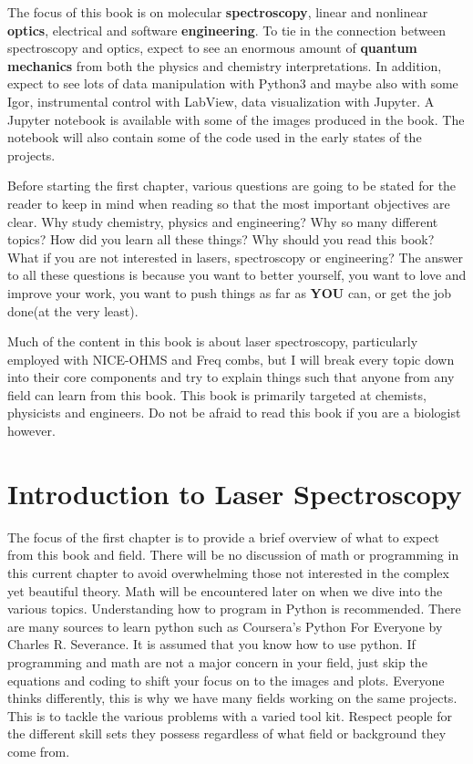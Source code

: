\documentclass[11pt,a4paper]{book}
\begin{document}
	The focus of this book is on molecular {\bfseries spectroscopy}, linear and nonlinear {\bfseries optics}, electrical and software {\bfseries engineering}. To tie in the connection between spectroscopy and optics, expect to see an enormous amount of {\bfseries quantum mechanics} from both the physics and chemistry interpretations. In addition, expect to see lots of data manipulation with Python3 and maybe also with some Igor, instrumental control with LabView, data visualization with Jupyter. A Jupyter notebook is available with some of the images produced in the book. The notebook will also contain some of the code used in the early states of the projects.
	
	Before starting the first chapter, various questions are going to be stated for the reader to keep in mind when reading so that the most important objectives are clear. Why study chemistry, physics and engineering? Why so many different topics? How did you learn all these things? Why should you read this book? What if you are not interested in lasers, spectroscopy or engineering? The answer to all these questions is because you want to better yourself, you want to love and improve your work, you want to push things as far as {\bfseries YOU} can, or get the job done(at the very least). 
	
	Much of the content in this book is about laser spectroscopy, particularly employed with NICE-OHMS and Freq combs, but I will break every topic down into their core components and try to explain things such that anyone from any field can learn from this book. This book is primarily targeted at chemists, physicists and engineers. Do not be afraid to read this book if you are a biologist however.
	
\mainmatter
\chapter{Introduction to Laser Spectroscopy}
	\label{chp:Introduction to Laser Spectroscopy}	
	The focus of the first chapter is to provide a brief overview of what to expect from this book and field. There will be no discussion of math or programming in this current chapter to avoid overwhelming those not interested in the complex yet beautiful theory. Math will be encountered later on when we dive into the various topics. Understanding how to program in Python is recommended. There are many sources to learn python such as Coursera's Python For Everyone by Charles R. Severance. It is assumed that you know how to use python. If programming and math are not a major concern in your field, just skip the equations and coding to shift your focus on to the images and plots. Everyone thinks differently, this is why we have many fields working on the same projects. This is to tackle the various problems with a varied tool kit. Respect people for the different skill sets they possess regardless of what field or background they come from.
	
\end{document}
